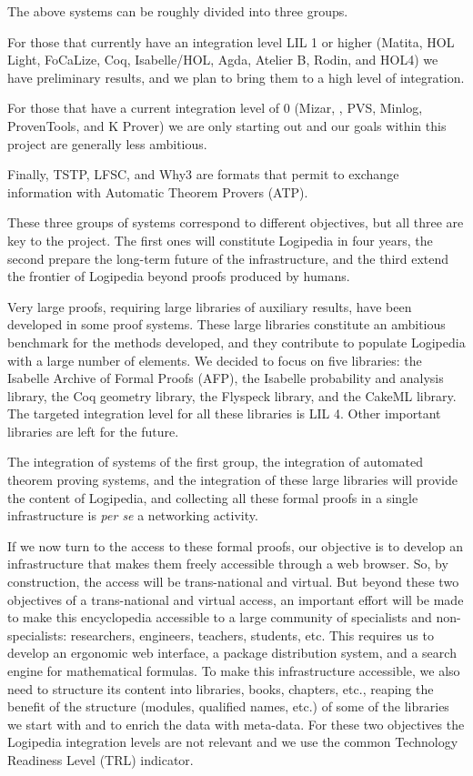 The above systems can be roughly divided into three groups.
\begin{compactitem}
\item For those
that currently have an integration level LIL 1 or higher (Matita, HOL
Light, FoCaLize, Coq, Isabelle/HOL, Agda, Atelier B, Rodin, and HOL4)
we have preliminary results, and we plan to bring them to a high level
of integration.
\item For those that have a current integration level of 0
(Mizar, \tlaplus, PVS, Minlog, ProvenTools, and K Prover) we are only
starting out and our goals within this project are generally less
ambitious.
\item Finally, TSTP, LFSC, and Why3 are formats that permit
to exchange information with Automatic Theorem Provers (ATP).
\end{compactitem}
These three groups of systems correspond to different
objectives, but all three are key to the project. The first ones will
constitute Logipedia in four years, the second prepare the
long-term future of the infrastructure, and the third extend the
frontier of Logipedia beyond proofs produced by humans.

Very large proofs, requiring large libraries of auxiliary results,
have been developed in some proof systems. These large libraries
constitute an ambitious benchmark for the methods developed, and they
contribute to populate Logipedia with a large number of elements.
We decided to focus on five libraries: the
Isabelle Archive of Formal Proofs (AFP), the Isabelle probability and
analysis library, the Coq geometry library, the Flyspeck library, and
the CakeML library. The targeted integration level for all these
libraries is LIL 4. Other important libraries are left for the future.

The integration of systems of the first group, the integration of
automated theorem proving systems, and the integration of these large
libraries will provide the content of Logipedia, and collecting all
these formal proofs in a single infrastructure is {\em per se} a
networking activity.

If we now turn to the access to these formal proofs, our objective is
to develop an infrastructure that makes them freely accessible through
a web browser. So, by construction, the access will be trans-national
and virtual. But beyond these two objectives of a trans-national and
virtual access, an important effort will be made to make this
encyclopedia accessible to a large community of specialists and
non-specialists: researchers, engineers, teachers, students, etc.
This requires us to develop an ergonomic web interface, a package
distribution system, and a search engine for mathematical formulas.
To make this infrastructure accessible, we also need to structure its
content into libraries, books, chapters, etc., reaping the benefit of
the structure (modules, qualified names, etc.) of some of the
libraries we start with and to enrich the data with meta-data.
For these two objectives the Logipedia integration levels are not
relevant and we use the common Technology Readiness Level (TRL) indicator.

